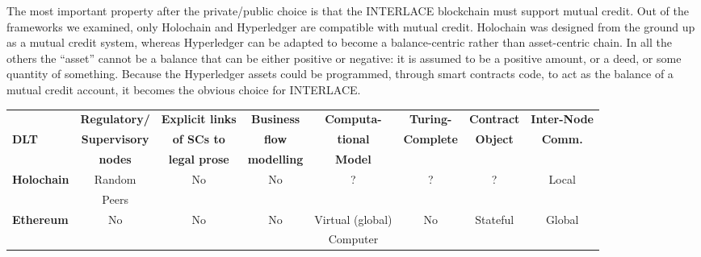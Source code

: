 The most important property after the private/public choice is that the INTERLACE blockchain must support mutual credit. Out of the frameworks we examined, only Holochain and Hyperledger are compatible with mutual credit. Holochain was designed from the ground up as a mutual credit system, whereas Hyperledger can be adapted to become a balance-centric rather than asset-centric chain. In all the others the ``asset'' cannot be a balance that can be either positive or negative: it is assumed to be a positive amount, or a deed, or some quantity of something. Because the Hyperledger assets could be programmed, through smart contracts code, to act as the balance of a mutual credit account, it becomes the obvious choice for INTERLACE.

\begin{table}
\small
\begin{centering}
{\begin{tabular}{| l | c | c | c | c | c | c | c |}
\hline
				& \textbf{Regulatory/} 	& \textbf{Explicit links}	&\textbf{Business}
				& \textbf{Computa-} 		& \textbf{Turing-}		&\textbf{Contract}	& \textbf{Inter-Node}	\\
\textbf{DLT}		& \textbf{Supervisory} 	& \textbf{of SCs to}		&\textbf{flow} 
				& \textbf{tional} 			& \textbf{Complete}		&\textbf{Object}		& \textbf{Comm.} \\
				& \textbf{nodes} 		& \textbf{legal prose}		&\textbf{modelling} 
				& \textbf{Model} 		& \textbf{}				&\textbf{} 			&\\
\hline
\hline
\textbf{Holochain}	&Random				&No			&No 		&?				&?
				&?					&Local \\
				&Peers				&			& 		&				&
				&					& \\
\hline
\textbf{Ethereum}	&No					&No			&No		&Virtual (global)			&No
				&Stateful 				&Global \\
				&					&			&		&Computer		&
				& 					& \\
\hline


\end{tabular}}
\end{centering}
\end{table}
